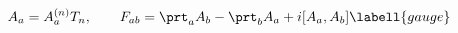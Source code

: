 \begin{equation}
A_a=A_a^{(n)}T_n,
\qquad F_{ab}=\prt_a A_b-\prt_b A_a+i[A_a,A_b]
\labell{gauge}
\end{equation}

